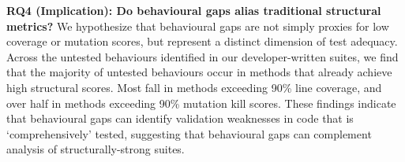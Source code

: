 \textbf{RQ4 (Implication): Do behavioural gaps alias traditional structural metrics?}
We hypothesize that behavioural gaps are not simply proxies for low coverage or mutation scores, but represent a distinct dimension of test adequacy. Across the untested behaviours identified in our developer-written suites, we find that the majority of untested behaviours occur in methods that already achieve high structural scores. Most fall in methods exceeding 90\% line coverage, and over half in methods exceeding 90\% mutation kill scores. %
These findings indicate that behavioural gaps can identify validation weaknesses in code that is `comprehensively' tested, suggesting that behavioural gaps can complement analysis of structurally-strong suites.



